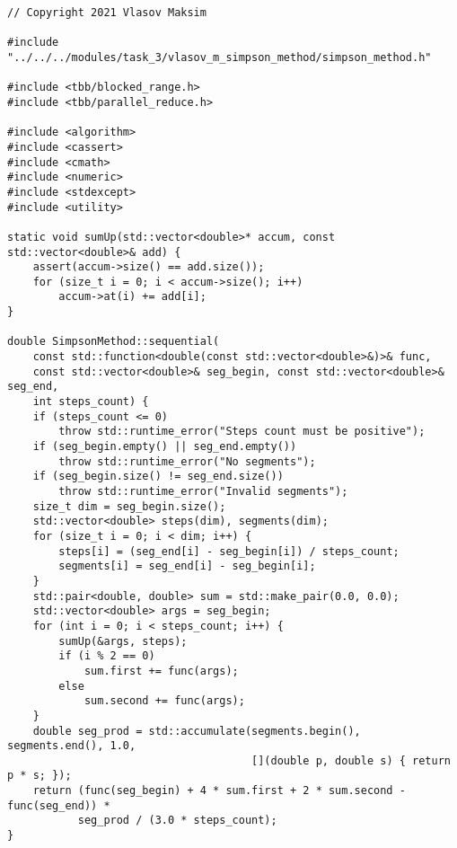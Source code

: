 \documentclass{report}
\begin{document}
\begin{lstlisting}
// Copyright 2021 Vlasov Maksim

#include "../../../modules/task_3/vlasov_m_simpson_method/simpson_method.h"

#include <tbb/blocked_range.h>
#include <tbb/parallel_reduce.h>

#include <algorithm>
#include <cassert>
#include <cmath>
#include <numeric>
#include <stdexcept>
#include <utility>

static void sumUp(std::vector<double>* accum, const std::vector<double>& add) {
    assert(accum->size() == add.size());
    for (size_t i = 0; i < accum->size(); i++)
        accum->at(i) += add[i];
}

double SimpsonMethod::sequential(
    const std::function<double(const std::vector<double>&)>& func,
    const std::vector<double>& seg_begin, const std::vector<double>& seg_end,
    int steps_count) {
    if (steps_count <= 0)
        throw std::runtime_error("Steps count must be positive");
    if (seg_begin.empty() || seg_end.empty())
        throw std::runtime_error("No segments");
    if (seg_begin.size() != seg_end.size())
        throw std::runtime_error("Invalid segments");
    size_t dim = seg_begin.size();
    std::vector<double> steps(dim), segments(dim);
    for (size_t i = 0; i < dim; i++) {
        steps[i] = (seg_end[i] - seg_begin[i]) / steps_count;
        segments[i] = seg_end[i] - seg_begin[i];
    }
    std::pair<double, double> sum = std::make_pair(0.0, 0.0);
    std::vector<double> args = seg_begin;
    for (int i = 0; i < steps_count; i++) {
        sumUp(&args, steps);
        if (i % 2 == 0)
            sum.first += func(args);
        else
            sum.second += func(args);
    }
    double seg_prod = std::accumulate(segments.begin(), segments.end(), 1.0,
                                      [](double p, double s) { return p * s; });
    return (func(seg_begin) + 4 * sum.first + 2 * sum.second - func(seg_end)) *
           seg_prod / (3.0 * steps_count);
}


\end{lstlisting}
\end{document}
